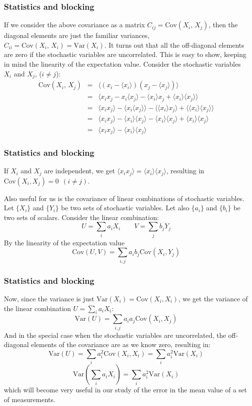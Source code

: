 \documentclass[compress]{beamer}
\newcommand{\be}{\begin{equation}}
\newcommand{\ee}{\end{equation}}
\newcommand{\beaN}{\begin{eqnarray*}}
\newcommand{\eeaN}{\end{eqnarray*}}
\newcommand{\bdm}{\begin{displaymath}}
\newcommand{\edm}{\end{displaymath}}
\newcommand{\mean}[1]{\langle #1 \rangle}
\newcommand{\meanb}[1]{\big\langle #1 \big\rangle}
\newcommand{\cov}[0]{\mathrm{Cov}}   %
\newcommand{\var}[0]{\mathrm{Var}}   %
\newcommand{\be}{\begin{equation}}                        %
\newcommand{\ee}{\end{equation}}                          %
\begin{document}
\frame
{
  \frametitle{Statistics and blocking}
\begin{small}
{\scriptsize
If we consider the above covariance as a matrix $C_{ij} =
\cov(X_i,\,X_j)$, then the diagonal elements are just the familiar
variances, $C_{ii} = \cov(X_i,\,X_i) = \var(X_i)$. It turns out that
all the off-diagonal elements are zero if the stochastic variables are
uncorrelated. This is easy to show, keeping in mind the linearity of
the expectation value. Consider the stochastic variables $X_i$ and
$X_j$, ($i\neq j$):
\beaN
\cov(X_i,\,X_j) &=& \meanb{(x_i-\mean{x_i})(x_j-\mean{x_j})}\\
&=&\mean{x_i x_j - x_i\mean{x_j} - \mean{x_i}x_j + \mean{x_i}\mean{x_j}}\\
&=&\mean{x_i x_j} - \mean{x_i\mean{x_j}} - \mean{\mean{x_i}x_j} +
\mean{\mean{x_i}\mean{x_j}}\\
&=&\mean{x_i x_j} - \mean{x_i}\mean{x_j} - \mean{x_i}\mean{x_j} +
\mean{x_i}\mean{x_j}\\
&=&\mean{x_i x_j} - \mean{x_i}\mean{x_j}
\eeaN
}
\end{small}
}

\frame
{
  \frametitle{Statistics and blocking}
\begin{small}
{\scriptsize
If $X_i$ and $X_j$ are independent, we get $\mean{x_i x_j} =
\mean{x_i}\mean{x_j}$, resulting in $\cov(X_i, X_j) = 0\ \ (i\neq j)$.

Also useful for us is the covariance of linear combinations of
stochastic variables. Let $\{X_i\}$ and $\{Y_i\}$ be two sets of
stochastic variables. Let also $\{a_i\}$ and $\{b_i\}$ be two sets of
scalars. Consider the linear combination:
\bdm
U = \sum_i a_i X_i \qquad V = \sum_j b_j Y_j
\edm
By the linearity of the expectation value
\bdm
\cov(U, V) = \sum_{i,j}a_i b_j \cov(X_i, Y_j)
\edm
}
\end{small}
}

\frame
{
  \frametitle{Statistics and blocking}
\begin{small}
{\scriptsize
Now, since the variance is just $\var(X_i) = \cov(X_i, X_i)$, we get
the variance of the linear combination $U = \sum_i a_i X_i$:
\be
\var(U) = \sum_{i,j}a_i a_j \cov(X_i, X_j)
\label{eq:variance_linear_combination}
\ee
And in the special case when the stochastic variables are
uncorrelated, the off-diagonal elements of the covariance are as we
know zero, resulting in:
\bdm
\var(U) = \sum_i a_i^2 \cov(X_i, X_i) = \sum_i a_i^2 \var(X_i)
\edm
\bdm
\var(\sum_i a_i X_i) = \sum_i a_i^2 \var(X_i)
\edm
which will become very useful in our study of the error in the mean
value of a set of measurements.
}
\end{small}
}
\end{document}
